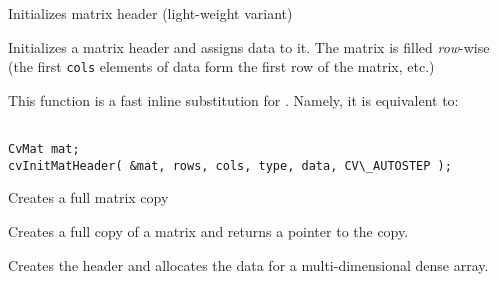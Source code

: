 \label{Mat}

Initializes matrix header (light-weight variant)


\begin{description}
\end{description}

Initializes a matrix header and assigns data to it. The matrix is filled \textit{row}-wise (the first \texttt{cols} elements of data form the first row of the matrix, etc.)

This function is a fast inline substitution for . Namely, it is equivalent to:

\begin{lstlisting}

CvMat mat;
cvInitMatHeader( &mat, rows, cols, type, data, CV\_AUTOSTEP );

\end{lstlisting}


\label{CloneMat}

Creates a full matrix copy


\begin{description}
\end{description}

Creates a full copy of a matrix and returns a pointer to the copy.

\label{CreateMatND}

Creates the header and allocates the data for a multi-dimensional dense array.



